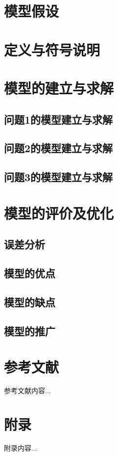 \documentclass{article}
\begin{document}
	\section{模型假设}  
	\section{定义与符号说明}  
	\section{模型的建立与求解}  
	\subsection{问题1的模型建立与求解}  
	\subsection{问题2的模型建立与求解}  
	\subsection{问题3的模型建立与求解}  
	\section{模型的评价及优化}  
	\subsection{误差分析}  
	\subsection{模型的优点}  
	\subsection{模型的缺点}  
	\subsection{模型的推广} 
	\newpage
	\pagestyle{plain}
	\section{参考文献}
	参考文献内容...  
	\newpage %
	\section{附录} 
	附录内容...  
	
	
	
	
\end{document}
